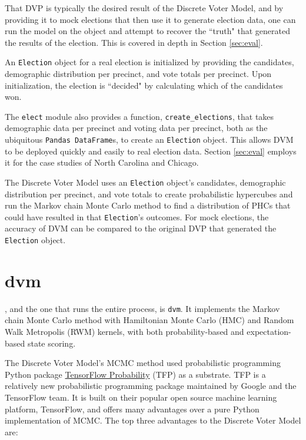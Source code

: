 That DVP is typically the desired result of the Discrete Voter Model, and by providing it to mock elections that then use it to generate election data, one can run the model on the object and attempt to recover the ``truth" that generated the results of the election. This is covered in depth in Section \ref{sec:eval}.

An \texttt{Election} object for a real election is initialized by providing the candidates, demographic distribution per precinct, and vote totals per precinct. Upon initialization, the election is ``decided" by calculating which of the candidates won.

The \texttt{elect} module also provides a function, \texttt{create\_elections}, that takes demographic data per precinct and voting data per precinct, both as the ubiquitous \texttt{Pandas DataFrame}s, to create an \texttt{Election} object. This allows DVM to be deployed quickly and easily to real election data. Section \ref{sec:eval} employs it for the case studies of North Carolina and Chicago.

The Discrete Voter Model uses an \texttt{Election} object's candidates, demographic distribution per precinct, and vote totals to create probabilistic hypercubes and run the Markov chain Monte Carlo method to find a distribution of PHCs that could have resulted in that \texttt{Election}'s outcomes. For mock elections, the accuracy of DVM can be compared to the original DVP that generated the \texttt{Election} object.


\section{dvm}
\label{sec:dvm}

, and the one that runs the entire process, is \texttt{dvm}. It implements the Markov chain Monte Carlo method with Hamiltonian Monte Carlo (HMC) and Random Walk Metropolis (RWM) kernels, with both probability-based and expectation-based state scoring.

The Discrete Voter Model's MCMC method used probabilistic programming Python package \href{https://www.tensorflow.org/probability}{TensorFlow Probability} (TFP) as a substrate. TFP is a relatively new probabilistic programming package maintained by Google and the TensorFlow team. It is built on their popular open source machine learning platform, TensorFlow, and offers many advantages over a pure Python implementation of MCMC.\cite{tfp} The top three advantages to the Discrete Voter Model are:

